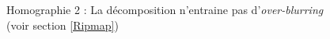
\begin{figure}
\caption{Homographie 2 : La décomposition n'entraine pas d'\emph{over-blurring} (voir section \ref{Ripmap})}
\label{Homo2}
\end{figure}

